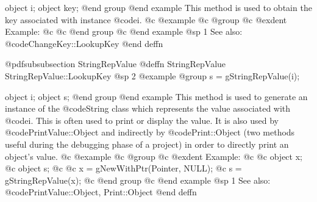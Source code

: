object  i;
object  key;
@end group
@end example
This method is used to obtain the key associated with instance @code{i}.
@c @example
@c @group
@c @exdent Example:
@c 
@c @end group
@c @end example
@sp 1
See also:  @code{ChangeKey::LookupKey}
@end deffn










@pdfsubsubsection {StringRepValue}
@deffn {StringRepValue} StringRepValue::LookupKey
@sp 2
@example
@group
s = gStringRepValue(i);

object  i;
object  s;
@end group
@end example
This method is used to generate an instance of the @code{String} class
which represents the value associated with @code{i}.  This is often
used to print or display the value.  It is also used by
@code{PrintValue::Object} and indirectly by @code{Print::Object}
(two methods useful during the debugging phase of a project)
in order to directly print an object's value.
@c @example
@c @group
@c @exdent Example:
@c 
@c object  x;
@c object  s;
@c 
@c x = gNewWithPtr(Pointer, NULL);
@c s = gStringRepValue(x);
@c @end group
@c @end example
@sp 1
See also:  @code{PrintValue::Object, Print::Object}
@end deffn








